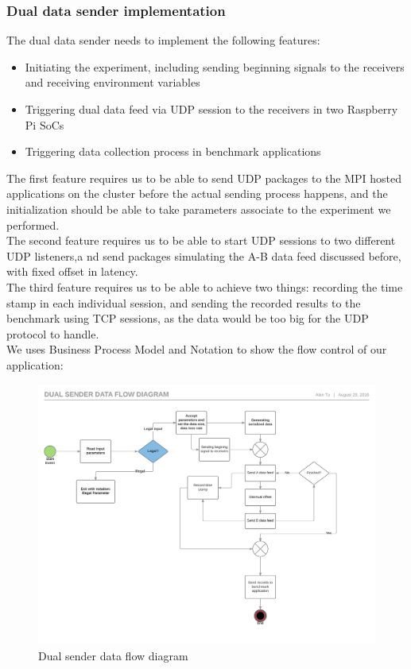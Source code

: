 \documentclass[11pt,openright,a4paper]{report}
\begin{document}
\subsubsection{Dual data sender implementation}
The dual data sender needs to implement the following features:
\begin{itemize}
	\item Initiating the experiment, including sending beginning signals to the receivers and receiving environment variables
	\item Triggering dual data feed via UDP session to the receivers in two Raspberry Pi SoCs
	\item Triggering data collection process in benchmark applications
\end{itemize}
The first feature requires us to be able to send UDP packages to the MPI hosted applications on the cluster before the actual sending process happens, and the initialization should be able to take parameters associate to the experiment we performed. \\
The second feature requires us to be able to start UDP sessions to two different UDP listeners,a nd send packages simulating the A-B data feed discussed before, with fixed offset in latency.\\
The third feature requires us to be able to achieve two things: recording the time stamp in each individual session, and sending the recorded results to the benchmark using TCP sessions, as the data would be too big for the UDP protocol to handle.\\
We uses Business Process Model and Notation to show the flow control of our application\cite{dijkman2011business}:
\begin{figure}[H]
\centering
\includegraphics[width=1.0\linewidth]{"picture/Dual sender data flow diagram - Page 1"}
\caption{Dual sender data flow diagram}
\label{fig:Dualsenderdataflowdiagram-Page1}
\end{figure}
\end{document}
